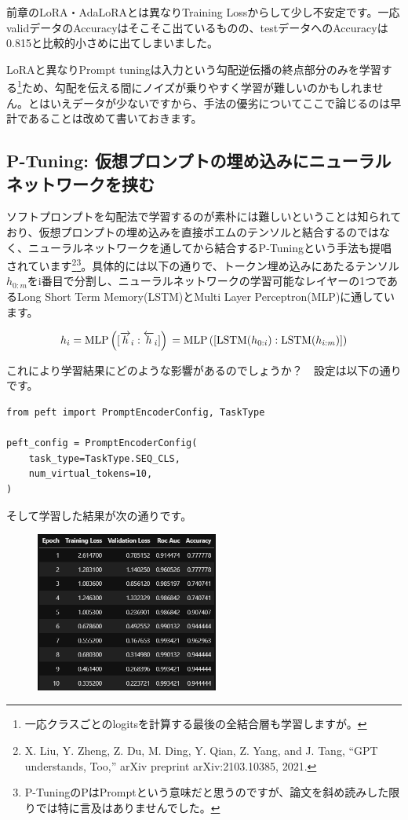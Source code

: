 \documentclass[a5paper,twoside,dvipdfmx]{jsarticle}
\begin{document}
前章のLoRA・AdaLoRAとは異なりTraining Lossからして少し不安定です。一応validデータのAccuracyはそこそこ出ているものの、testデータへのAccuracyは0.815と比較的小さめに出てしまいました。

LoRAと異なりPrompt tuningは入力という勾配逆伝播の終点部分のみを学習する\footnote{一応クラスごとのlogitsを計算する最後の全結合層も学習しますが。}ため、勾配を伝える間にノイズが乗りやすく学習が難しいのかもしれません。とはいえデータが少ないですから、手法の優劣についてここで論じるのは早計であることは改めて書いておきます。

\subsection{P-Tuning: 仮想プロンプトの埋め込みにニューラルネットワークを挟む}

ソフトプロンプトを勾配法で学習するのが素朴には難しいということは知られており、仮想プロンプトの埋め込みを直接ポエムのテンソルと結合するのではなく、ニューラルネットワークを通してから結合する\textsf{P-Tuning}という手法も提唱されています\footnote{X. Liu, Y. Zheng, Z. Du, M. Ding, Y. Qian, Z. Yang, and J. Tang, “GPT understands, Too,” arXiv preprint arXiv:2103.10385, 2021.}\footnote{P-TuningのPはPromptという意味だと思うのですが、論文を斜め読みした限りでは特に言及はありませんでした。}。具体的には以下の通りで、トークン埋め込みにあたるテンソル$h_{0:m}$をi番目で分割し、ニューラルネットワークの学習可能なレイヤーの1つであるLong Short Term Memory(LSTM)とMulti Layer Perceptron(MLP)に通しています。

$$
h_i = \mathrm{MLP} \left( [\overrightarrow{h}_i : \overleftarrow{h}_i] \right) \\
= \mathrm{MLP} \left( [\mathrm{LSTM}(h_{0:i}) : \mathrm{LSTM}(h_{i:m})] \right)
$$

これにより学習結果にどのような影響があるのでしょうか？　設定は以下の通りです。

\begin{lstlisting}
from peft import PromptEncoderConfig, TaskType
  
peft_config = PromptEncoderConfig(
    task_type=TaskType.SEQ_CLS,
    num_virtual_tokens=10,
)
\end{lstlisting}

そして学習した結果が次の通りです。

\newpage

\begin{figure}[h]
  \centering
  \includegraphics[width=60mm]{../C105Fig/gray/ptuning_train.png}
 \end{figure} 
\end{document}
